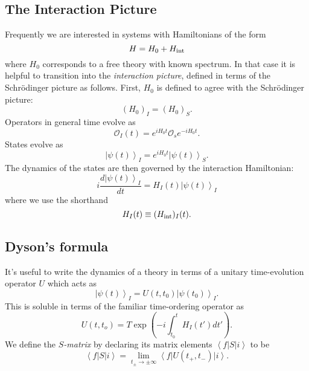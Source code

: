 \documentclass[12 pt]{article}
\newcommand{\KET}[1]{\left| #1 \right\rangle }
\newcommand{\BRA}[1]{\left\langle #1 \right| }
\newcommand{\LP}{\left(}
\newcommand{\RP}{\right)}
\numberwithin{equation}{section}
\begin{document}
\subsection{The Interaction Picture}
Frequently we are interested in systems with Hamiltonians of the form \begin{equation*}
H = H_0 + H_{\mbox{\scriptsize{int}}}
\end{equation*}
where $H_0$ corresponds to a free theory with known spectrum. In that case it is helpful to transition into the \textit{interaction picture}, defined in terms of the Schr\"{o}dinger picture as follows. First, $H_0$ is defined to agree with the Schr\"{o}dinger picture: \begin{equation*}
(H_0)_I = (H_0)_S.
\end{equation*}
Operators in general time evolve as \begin{equation*}
\mathcal{O}_I (t) = e^{i H_0 t} \mathcal{O}_s e^{- i H_0 t}.
\end{equation*}
States evolve as \begin{equation*}
\KET{\psi(t)}_I = e^{i H_0 t} \KET{\psi(t)}_S.
\end{equation*}
The dynamics of the states are then governed by the interaction Hamiltonian: \begin{equation*}
i \frac{d \KET{\psi(t)}_I}{dt} = H_I (t) \KET{\psi(t)}_I
\end{equation*}
where we use the shorthand \begin{equation*}
H_I (t)  \equiv (H_{\mbox{\scriptsize{int}}})_I(t).
\end{equation*}
\subsection{Dyson's formula}
It's useful to write the dynamics of a theory in terms of a unitary time-evolution operator $U$ which acts as\begin{equation*}
\KET{\psi(t)}_I = U(t, t_0) \KET{\psi(t_0)}_I.
\end{equation*}
This is soluble in terms of the familiar time-ordering operator as \begin{equation*}
U(t, t_o) = T \exp \LP -i \int _{t_0} ^t H_I (t') dt' \RP.
\end{equation*}
We define the \textit{$S$-matrix} by declaring its matrix elements $\BRA{f} S \KET{i}$ to be \begin{equation*}
\BRA{f} S \KET{i} = \lim _{t_\pm \to \pm \infty} \BRA{f} U(t_+, t_-) \KET{i}.
\end{equation*}
\end{document}
